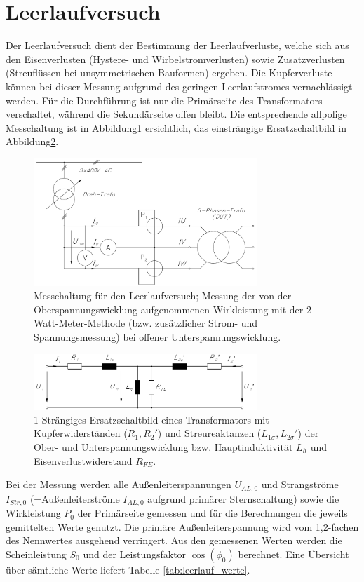 \section{Leerlaufversuch}
Der Leerlaufversuch dient der Bestimmung der Leerlaufverluste,  welche sich aus den Eisenverlusten (Hystere- und Wirbelstromverlusten) sowie Zusatzverlusten (Streuflüssen bei  unsymmetrischen Bauformen) ergeben. Die Kupferverluste können bei dieser Messung aufgrund des geringen Leerlaufstromes vernachlässigt werden. Für die Durchführung ist nur die Primärseite des Transformators verschaltet, während die Sekundärseite offen bleibt. Die entsprechende allpolige Messchaltung ist in Abbildung\;\ref{fig:Leerlauf_3straengig} ersichtlich, das einsträngige Ersatzschaltbild in Abbildung\;\ref{fig:Leerlauf_ESB_1straengig}.\\
\begin{figure}[h!]
    \centering
    \includegraphics[width=0.75\textwidth, angle=0]{1/images/Leerlauf_3straengig.pdf}
    \caption{Messchaltung für den Leerlaufversuch; Messung der von der Oberspannungswicklung aufgenommenen Wirkleistung mit der 2-Watt-Meter-Methode (bzw. zusätzlicher Strom- und Spannungsmessung) bei offener Unterspannungswicklung.}
    \label{fig:Leerlauf_3straengig}
\end{figure}
\begin{figure}[h!]
    \centering
    \includegraphics[width=0.75\textwidth, angle=0]{1/images/ESB_1straengig.pdf}
    \caption{1-Strängiges Ersatzschaltbild eines Transformators mit Kupferwiderständen ($R_1, R_2'$) und Streureaktanzen ($L_{1\sigma}, L_{2\sigma}'$) der Ober- und Unterspannungswicklung bzw. Hauptinduktivität $L_h$ und Eisenverlustwiderstand $R_{FE}$.}
    \label{fig:Leerlauf_ESB_1straengig}
\end{figure}
\noindent 
Bei der Messung werden alle Außenleiterspannungen $U_{AL,0}$ und Strangströme $I_{Str,0}$ (=Außenleiterströme $I_{AL,0}$ aufgrund primärer Sternschaltung) sowie die Wirkleistung $P_0$ der Primärseite gemessen und für die Berechnungen die jeweils gemittelten Werte genutzt. 
Die primäre Außenleiterspannung wird vom 1,2-fachen des Nennwertes ausgehend verringert. Aus den gemessenen Werten werden die Scheinleistung $S_0$ und der Leistungsfaktor $\cos{(\phi_0)}$ berechnet. Eine Übersicht über sämtliche Werte liefert Tabelle \ref{tab:leerlauf_werte}. 

